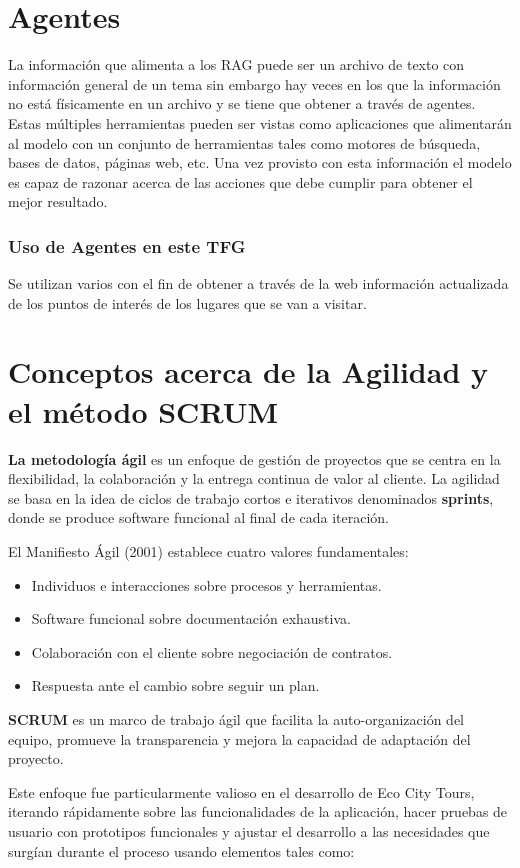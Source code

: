 \section{Agentes}
\label{sec:agentes}
La información que alimenta a los RAG puede ser un archivo de texto con información general de un tema sin embargo hay veces en los que la información no está físicamente en un archivo y se tiene que obtener a través de agentes.
Estas múltiples herramientas pueden ser vistas como aplicaciones que alimentarán al modelo con un conjunto de herramientas tales como motores de búsqueda, bases de datos, páginas web, etc. Una vez provisto con esta información el modelo es capaz de razonar acerca de las acciones que debe cumplir para obtener el mejor resultado.
\subsubsection{Uso de Agentes en este TFG}
Se utilizan varios con el fin de obtener a través de la web información actualizada de los puntos de interés de los lugares que se van a visitar.

\section{Conceptos acerca de la Agilidad y el método SCRUM}
\textbf{La metodología ágil} es un enfoque de gestión de proyectos que se centra en la flexibilidad, la colaboración y la entrega continua de valor al cliente. La agilidad se basa en la idea de ciclos de trabajo cortos e iterativos denominados \textbf{sprints}, donde se produce software funcional al final de cada iteración.

El Manifiesto Ágil (2001) establece cuatro valores fundamentales:
\begin{itemize}
\item Individuos e interacciones sobre procesos y herramientas.
\item Software funcional sobre documentación exhaustiva.
\item Colaboración con el cliente sobre negociación de contratos.
\item Respuesta ante el cambio sobre seguir un plan.
\end{itemize}

\textbf{SCRUM} es un marco de trabajo ágil que facilita la auto-organización del equipo, promueve la transparencia y mejora la capacidad de adaptación del proyecto.

Este enfoque fue particularmente valioso en el desarrollo de Eco City Tours, iterando rápidamente sobre las funcionalidades de la aplicación, hacer pruebas de usuario con prototipos funcionales y ajustar el desarrollo a las necesidades que surgían durante el proceso usando elementos tales como:

